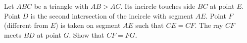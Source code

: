 Let $ABC$ be a triangle with $AB>AC$. Its incircle touches side $BC$ at point $E$. Point $D$ is the second intersection of the incircle with segment $AE$. Point $F$ (different from $E$) is taken on segment $AE$ such that $CE=CF$. The ray $CF$ meets $BD$ at point $G$. Show that $CF=FG$.